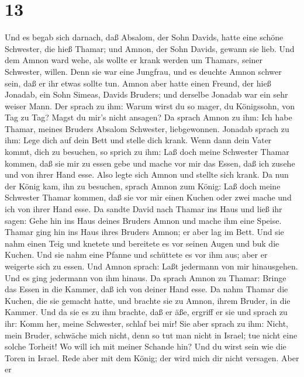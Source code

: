 \hypertarget{section-12}{%
\section{13}\label{section-12}}

 Und es begab sich darnach, daß Absalom, der Sohn Davids,
hatte eine schöne Schwester, die hieß Thamar; und Amnon, der Sohn
Davids, gewann sie lieb.  Und dem Amnon ward wehe, als
wollte er krank werden um Thamars, seiner Schwester, willen. Denn sie
war eine Jungfrau, und es deuchte Amnon schwer sein, daß er ihr etwas
sollte tun.  Amnon aber hatte einen Freund, der hieß
Jonadab, ein Sohn Simeas, Davids Bruders; und derselbe Jonadab war ein
sehr weiser Mann.  Der sprach zu ihm: Warum wirst du so
mager, du Königssohn, von Tag zu Tag? Magst du mir's nicht ansagen? Da
sprach Amnon zu ihm: Ich habe Thamar, meines Bruders Absalom Schwester,
liebgewonnen.  Jonadab sprach zu ihm: Lege dich auf dein
Bett und stelle dich krank. Wenn dann dein Vater kommt, dich zu
besuchen, so sprich zu ihm: Laß doch meine Schwester Thamar kommen, daß
sie mir zu essen gebe und mache vor mir das Essen, daß ich zusehe und
von ihrer Hand esse.  Also legte sich Amnon und stellte sich
krank. Da nun der König kam, ihn zu besuchen, sprach Amnon zum König:
Laß doch meine Schwester Thamar kommen, daß sie vor mir einen Kuchen
oder zwei mache und ich von ihrer Hand esse.  Da sandte
David nach Thamar ins Haus und ließ ihr sagen: Gehe hin ins Haus deines
Bruders Amnon und mache ihm eine Speise.  Thamar ging hin
ins Haus ihres Bruders Amnon; er aber lag im Bett. Und sie nahm einen
Teig und knetete und bereitete es vor seinen Augen und buk die Kuchen.
 Und sie nahm eine Pfanne und schüttete es vor ihm aus; aber
er weigerte sich zu essen. Und Amnon sprach: Laßt jedermann von mir
hinausgehen. Und es ging jedermann von ihm hinaus.  Da
sprach Amnon zu Thamar: Bringe das Essen in die Kammer, daß ich von
deiner Hand esse. Da nahm Thamar die Kuchen, die sie gemacht hatte, und
brachte sie zu Amnon, ihrem Bruder, in die Kammer.  Und da
sie es zu ihm brachte, daß er äße, ergriff er sie und sprach zu ihr:
Komm her, meine Schwester, schlaf bei mir!  Sie aber sprach
zu ihm: Nicht, mein Bruder, schwäche mich nicht, denn so tut man nicht
in Israel; tue nicht eine solche Torheit!  Wo will ich mit
meiner Schande hin? Und du wirst sein wie die Toren in Israel. Rede aber
mit dem König; der wird mich dir nicht versagen.  Aber er
